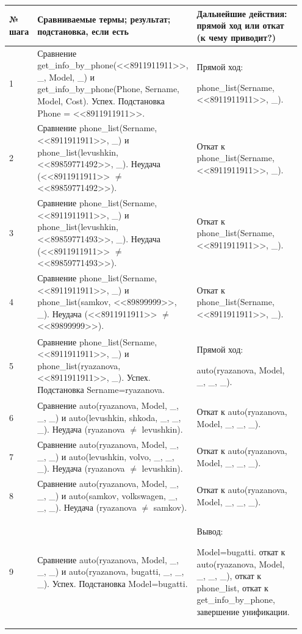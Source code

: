 \documentclass[a4paper,12pt]{article}
\begin{document}
	\begin{table} [h!]
		\begin{center}
			\begin{tabular}{|p{0.05\linewidth}|p{0.5\linewidth}|p{0.4\linewidth}|}
				\hline
				{\bf  № шага} & {\bf Сравниваемые термы; результат; подстановка, если есть} & {\bf Дальнейшие действия: прямой ход или откат (к чему приводит?)} \\
				\hline
				{1} & {Сравнение get\_info\_by\_phone(<<8911911911>>, \_, Model, \_) и get\_info\_by\_phone(Phone, Sername, Model, Cost). Успех. Подстановка Phone = <<8911911911>>.} & {Прямой ход: 
					
					 phone\_list(Sername, <<8911911911>>, \_).}\\
				\hline
				{2} & {Сравнение phone\_list(Sername, <<8911911911>>, \_) и phone\_list(levushkin, <<89859771492>>, \_). Неудача (<<8911911911>> $\neq$ <<89859771492>>).} & {Откат к phone\_list(Sername, <<8911911911>>, \_).}\\
				\hline
				{3} & {Сравнение phone\_list(Sername, <<8911911911>>, \_) и phone\_list(levushkin, <<89859771493>>, \_). Неудача (<<8911911911>> $\neq$ <<89859771493>>).} & {Откат к phone\_list(Sername, <<8911911911>>, \_).}\\
				\hline
				{4} & {Сравнение phone\_list(Sername, <<8911911911>>, \_) и phone\_list(samkov, <<89899999>>, \_). Неудача (<<8911911911>> $\neq$ <<89899999>>).} & {Откат к phone\_list(Sername, <<8911911911>>, \_).}\\
				\hline
				{5} & {Сравнение phone\_list(Sername, <<8911911911>>, \_) и phone\_list(ryazanova, <<8911911911>>, \_). Успех. Подстановка Sername=ryazanova.} & {Прямой ход: 
					
					 auto(ryazanova, Model, \_, \_, \_).}\\
				\hline
				{6} & {Сравнение auto(ryazanova, Model, \_, \_, \_) и auto(levushkin, shkoda, \_, \_, \_). Неудача (ryazanova $\neq$ levushkin).} & {Откат к auto(ryazanova, Model, \_, \_, \_).}\\
				\hline
				{7} & {Сравнение auto(ryazanova, Model, \_, \_, \_) и auto(levushkin, volvo, \_, \_, \_). Неудача (ryazanova $\neq$ levushkin).} & {Откат к auto(ryazanova, Model, \_, \_, \_).}\\
				\hline
				{8} & {Сравнение auto(ryazanova, Model, \_, \_, \_) и auto(samkov, volkswagen, \_, \_, \_). Неудача (ryazanova $\neq$ samkov).} & {Откат к auto(ryazanova, Model, \_, \_, \_).}\\
				\hline
				{9} & {Сравнение auto(ryazanova, Model, \_, \_, \_) и auto(ryazanova, bugatti, \_, \_, \_). Успех. Подстановка Model=bugatti.} & {Вывод: 
					
					 Model=bugatti. откат к auto(ryazanova, Model, \_, \_, \_), откат к phone\_list, откат к get\_info\_by\_phone, завершение унификации.}\\
				\hline
			\end{tabular}  
			\label{m2}
		\end{center}
	\end{table}
\end{document}
